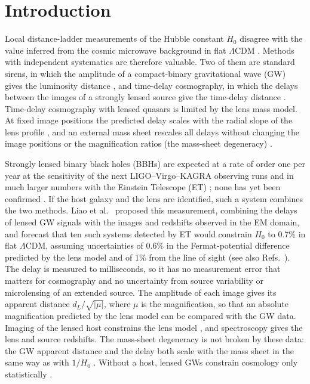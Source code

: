 \section{Introduction}
\label{sec:intro}
Local distance-ladder measurements of the Hubble constant $H_0$ disagree with the value inferred from the cosmic microwave background in flat $\Lambda$CDM \citep{riess2022shoes,planck2020cosmology}. Methods with independent systematics are therefore valuable. Two of them are standard sirens, in which the amplitude of a compact-binary gravitational wave (GW) gives the luminosity distance \citep{schutz1986,holz2005,lvk2017h0}, and time-delay cosmography, in which the delays between the images of a strongly lensed source give the time-delay distance \citep{refsdal1964,treu2016review,wong2020h0licow,birrer2020tdcosmo,tdcosmo2025}. Time-delay cosmography with lensed quasars is limited by the lens mass model. At fixed image positions the predicted delay scales with the radial slope of the lens profile \citep{wucknitz2002,kochanek2002}, and an external mass sheet rescales all delays without changing the image positions or the magnification ratios (the mass-sheet degeneracy) \citep{falco1985msd,schneider2013msd}.

Strongly lensed binary black holes (BBHs) are expected at a rate of order one per year at the sensitivity of the next LIGO--Virgo--KAGRA observing runs and in much larger numbers with the Einstein Telescope (ET) \citep{ng2018rates,li2018statistical,oguri2018distribution,wierda2021beyond}; none has yet been confirmed \citep{lvk2021o3a,lvk2024o3search,lvk2025gwtc4lensing}. If the host galaxy and the lens are identified, such a system combines the two methods. Liao et al.~\citep{liao2017precision} proposed this measurement, combining the delays of lensed GW signals with the images and redshifts observed in the EM domain, and forecast that ten such systems detected by ET would constrain $H_0$ to 0.7\% in flat $\Lambda$CDM, assuming uncertainties of 0.6\% in the Fermat-potential difference predicted by the lens model and of 1\% from the line of sight (see also Refs.~\citep{fan2017speed,hannuksela2020localizing}). The delay is measured to milliseconds, so it has no measurement error that matters for cosmography and no uncertainty from source variability or microlensing of an extended source. The amplitude of each image gives its apparent distance $d_L/\sqrt{|\mu|}$, where $\mu$ is the magnification, so that an absolute magnification predicted by the lens model can be compared with the GW data. Imaging of the lensed host constrains the lens model \citep{hannuksela2020localizing,wempe2022lensing,uronen2026silmarel,uronen2026galacticcentres}, and spectroscopy gives the lens and source redshifts. The mass-sheet degeneracy is not broken by these data: the GW apparent distance and the delay both scale with the mass sheet in the same way as with $1/H_0$ \citep{poon2025degeneracy}. Without a host, lensed GWs constrain cosmology only statistically \citep{jana2023cosmography}.

